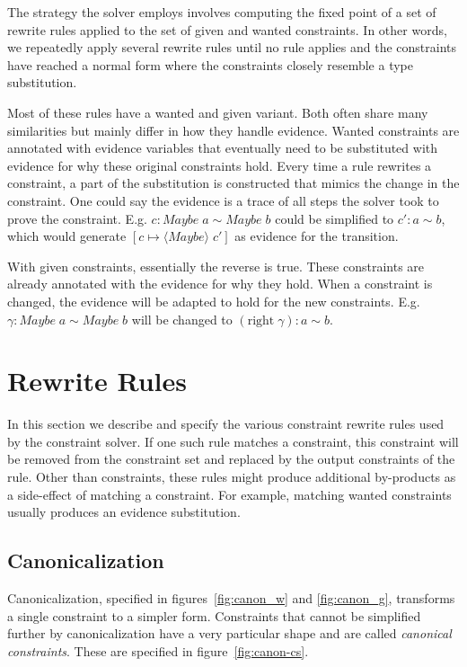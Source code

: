 The strategy the solver employs involves computing the fixed point of a set of
rewrite rules applied to the set of given and wanted constraints. In other
words, we repeatedly apply several rewrite rules until no rule applies and the
constraints have reached a normal form where the constraints closely resemble a
type substitution.

Most of these rules have a wanted and given variant. Both often share many
similarities but mainly differ in how they handle evidence. Wanted constraints
are annotated with evidence variables that eventually need to be substituted
with evidence for why these original constraints hold. Every time a rule
rewrites a constraint, a part of the substitution is constructed that mimics the
change in the constraint. One could say the evidence is a trace of all steps the
solver took to prove the constraint. E.g. $c : Maybe \; a \sim Maybe \; b$ could
be simplified to $c': a \sim b$, which would generate $[c \mapsto \langle Maybe
\rangle \; c']$ as evidence for the transition. %

With given constraints, essentially the reverse is true. These constraints are
already annotated with the evidence for why they hold. When a constraint is
changed, the evidence will be adapted to hold for the new constraints. E.g.
$\gamma : Maybe \; a \sim Maybe \; b$ will be changed to $(\text{right}\; \gamma) :
a \sim b$.

\section{Rewrite Rules}
In this section we describe and specify the various constraint rewrite rules
used by the constraint solver. If one such rule matches a constraint, this
constraint will be removed from the constraint set and replaced by the output
constraints of the rule. Other than constraints, these rules might produce
additional by-products as a side-effect of matching a constraint. For example,
matching wanted constraints usually produces an evidence substitution.


\subsection{Canonicalization}
\label{sec:canonicalization}

Canonicalization, specified in figures~\ref{fig:canon_w} and \ref{fig:canon_g},
transforms a single constraint to a simpler form. Constraints that cannot be
simplified further by canonicalization have a very particular shape and are
called \textit{canonical constraints}. These are specified in
figure~\ref{fig:canon-cs}.

